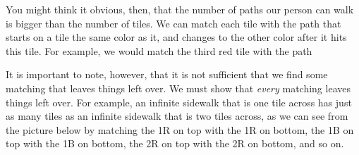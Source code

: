 \documentclass[letterpaper,11pt,showproblems]{pset}
\theoremstyle{definition} \newtheorem{defn}{Definition}[section]
\theoremstyle{definition} \newtheorem*{defn*}{Definition}
\begin{document}
  You might think it obvious, then, that the number of paths our person can walk is bigger than the number of tiles.  We can match each tile with the path that starts on a tile the same color as it, and changes to the other color after it hits this tile.  For example, we would match the third red tile with the path
  \begin{center}
  \end{center}

  It is important to note, however, that it is not sufficient that we find some matching that leaves things left over.  We must show that \emph{every} matching leaves things left over.  For example, an infinite sidewalk that is one tile across has just as many tiles as an infinite sidewalk that is two tiles across, as we can see from the picture below by matching the 1R on top with the 1R on bottom, the 1B on top with the 1B on bottom, the 2R on top with the 2R on bottom, and so on.
\end{document}
